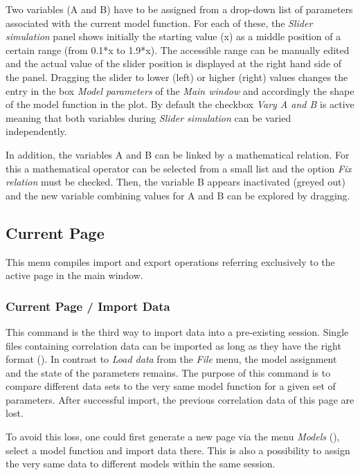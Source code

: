 Two variables (A and B) have to be assigned from a drop-down list of parameters associated with the current model function. For each of these, the \textit{Slider simulation} panel shows initially the starting value (x) as a middle position of a certain range (from 0.1*x to 1.9*x). The accessible range can be manually edited and the actual value of the slider position is displayed at the right hand side of the panel. Dragging the slider to lower (left) or higher (right) values changes the entry in the box \textit{Model parameters} of the \textit{Main window} and accordingly the shape of the model function in the plot. By default the checkbox \textit{Vary A and B}\textit{ }is active meaning that both variables during \textit{Slider simulation} can be varied independently. 

In addition, the variables A and B can be linked by a mathematical relation. For this a mathematical operator can be selected from a small list and the option \textit{Fix relation} must be checked. Then, the variable B appears inactivated (greyed out) and the new variable combining values for A and B can be explored by dragging.

\subsection{Current Page}
\label{sec:menub.curre}
This menu compiles import and export operations referring exclusively to the active page in the main window. 

\subsubsection{Current Page / Import Data}
\label{sec:menub.curre.impor}
This command is the third way to import data into a pre-existing session. Single files containing correlation data can be imported as long as they have the right format (). In contrast to \textit{Load data} from the \textit{File} menu, the model assignment and the state of the parameters remains. The purpose of this command is to compare different data sets to the very same model function for a given set of parameters. After successful import, the previous correlation data of this page are lost.

To avoid this loss, one could first generate a new page via the menu \textit{Models} (), select a model function and import data there. This is also a possibility to assign the very same data to different models within the same session.

